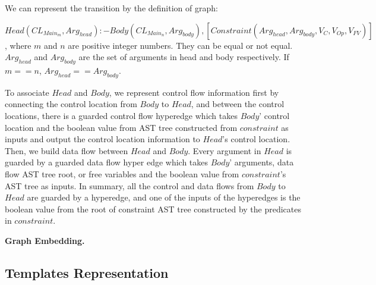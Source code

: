 \documentclass{article}
\begin{document}
We can represent the transition by the definition of graph:


$Head(CL_{Main_{m}},Arg_{head}):-Body(CL_{Main_{n}},Arg_{body}),[Constraint(Arg_{head},Arg_{body},V_{C},V_{Op},V_{FV})]$, where $m$ and $n$ are positive integer numbers. They can be equal or not equal. $Arg_{head}$ and $Arg_{body}$ are the set of arguments in head and body respectively. If $m==n$, $Arg_{head} == Arg_{body}$.

To associate $Head$ and $Body$, we represent control flow information first by connecting the control location from $Body$ to $Head$, and between the control locations, there is a guarded control flow hyperedge which takes $Body$' control location and the boolean value from AST tree constructed from $constraint$ as inputs and output the control location information to $Head$'s control location. Then, we build data flow between $Head$ and $Body$. Every argument in $Head$ is guarded by a guarded data flow hyper edge which takes $Body$' arguments, data flow AST tree root, or free variables and the boolean value from $constraint$'s AST tree as inputs. In summary, all the control and data flows from $Body$ to $Head$ are guarded by a hyperedge, and one of the inputs of the hyperedges is the boolean value from the root of constraint AST tree constructed by the predicates in $constraint$.

\textbf{Graph Embedding.}



\subsection{Templates Representation}
\end{document}
